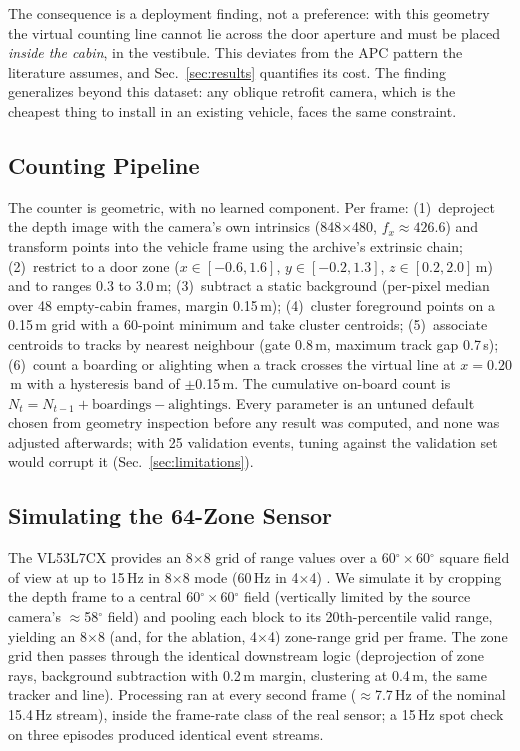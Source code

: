 \documentclass[conference]{IEEEtran}
\begin{document}
The consequence is a deployment finding, not a preference: with this geometry
the virtual counting line cannot lie across the door aperture and must be
placed \emph{inside the cabin}, in the vestibule. This deviates from the APC
pattern the literature assumes, and Sec.~\ref{sec:results} quantifies its
cost. The finding generalizes beyond this dataset: any oblique retrofit
camera, which is the cheapest thing to install in an existing vehicle, faces
the same constraint.

\subsection{Counting Pipeline}

The counter is geometric, with no learned component. Per frame: (1)~deproject
the depth image with the camera's own intrinsics (848$\times$480,
$f_x \approx 426.6$) and transform points into the vehicle frame using the
archive's extrinsic chain; (2)~restrict to a door zone ($x \in [-0.6, 1.6]$,
$y \in [-0.2, 1.3]$, $z \in [0.2, 2.0]$\,m) and to ranges 0.3 to 3.0\,m;
(3)~subtract a static background (per-pixel median over 48 empty-cabin frames,
margin 0.15\,m); (4)~cluster foreground points on a 0.15\,m grid with a
60-point minimum and take cluster centroids; (5)~associate centroids to tracks
by nearest neighbour (gate 0.8\,m, maximum track gap 0.7\,s); (6)~count a
boarding or alighting when a track crosses the virtual line at $x=0.20$\,m
with a hysteresis band of $\pm$0.15\,m. The cumulative on-board count is
$N_t = N_{t-1} + \text{boardings} - \text{alightings}$. Every parameter is an
untuned default chosen from geometry inspection before any result was
computed, and none was adjusted afterwards; with 25 validation events, tuning
against the validation set would corrupt it (Sec.~\ref{sec:limitations}).

\subsection{Simulating the 64-Zone Sensor}

The VL53L7CX provides an 8$\times$8 grid of range values over a
60$^\circ\times$60$^\circ$ square field of view at up to 15\,Hz in 8$\times$8
mode (60\,Hz in 4$\times$4) \cite{st_vl53l7cx}. We simulate it by cropping the
depth frame to a central 60$^\circ\times$60$^\circ$ field (vertically limited
by the source camera's $\approx$58$^\circ$ field) and pooling each block to
its 20th-percentile valid range, yielding an 8$\times$8 (and, for the
ablation, 4$\times$4) zone-range grid per frame. The zone grid then passes
through the identical downstream logic (deprojection of zone rays, background
subtraction with 0.2\,m margin, clustering at 0.4\,m, the same tracker and
line). Processing ran at every second frame ($\approx$7.7\,Hz of the nominal
15.4\,Hz stream), inside the frame-rate class of the real sensor; a 15\,Hz
spot check on three episodes produced identical event streams.
\end{document}
